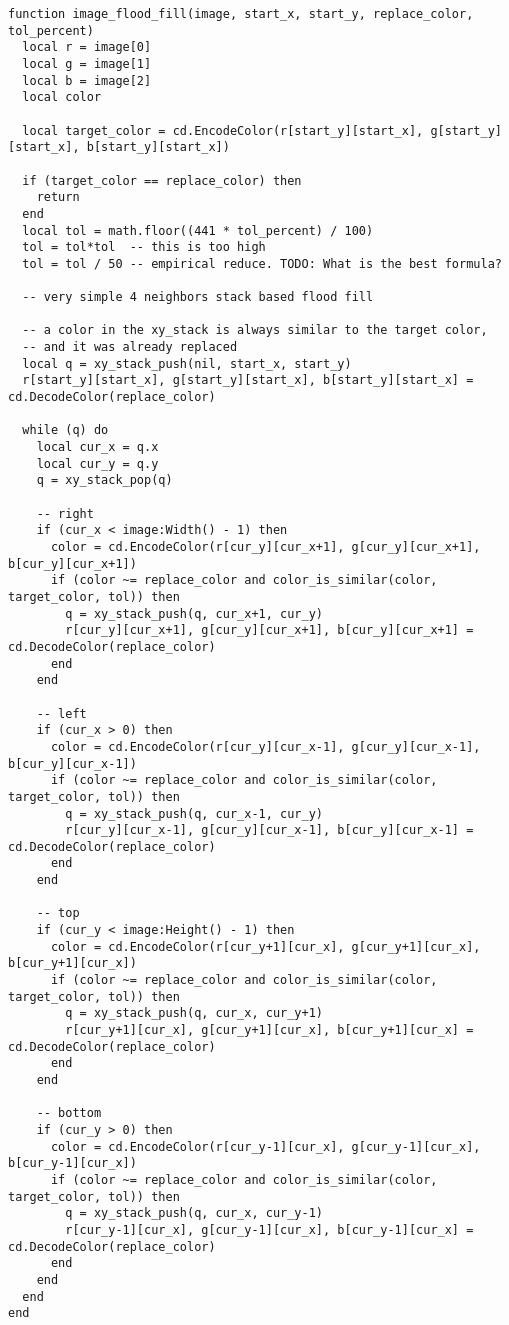 \documentclass{ctexart}
\begin{document}
\begin{lstlisting}
function image_flood_fill(image, start_x, start_y, replace_color, tol_percent)
  local r = image[0]
  local g = image[1]
  local b = image[2]
  local color

  local target_color = cd.EncodeColor(r[start_y][start_x], g[start_y][start_x], b[start_y][start_x])
  
  if (target_color == replace_color) then
    return
  end
  local tol = math.floor((441 * tol_percent) / 100)
  tol = tol*tol  -- this is too high
  tol = tol / 50 -- empirical reduce. TODO: What is the best formula?

  -- very simple 4 neighbors stack based flood fill

  -- a color in the xy_stack is always similar to the target color,
  -- and it was already replaced
  local q = xy_stack_push(nil, start_x, start_y)
  r[start_y][start_x], g[start_y][start_x], b[start_y][start_x] = cd.DecodeColor(replace_color)
  
  while (q) do
    local cur_x = q.x
    local cur_y = q.y
    q = xy_stack_pop(q)
    
    -- right 
    if (cur_x < image:Width() - 1) then
      color = cd.EncodeColor(r[cur_y][cur_x+1], g[cur_y][cur_x+1], b[cur_y][cur_x+1])
      if (color ~= replace_color and color_is_similar(color, target_color, tol)) then
        q = xy_stack_push(q, cur_x+1, cur_y)
        r[cur_y][cur_x+1], g[cur_y][cur_x+1], b[cur_y][cur_x+1] = cd.DecodeColor(replace_color)
      end
    end

    -- left 
    if (cur_x > 0) then
      color = cd.EncodeColor(r[cur_y][cur_x-1], g[cur_y][cur_x-1], b[cur_y][cur_x-1])
      if (color ~= replace_color and color_is_similar(color, target_color, tol)) then
        q = xy_stack_push(q, cur_x-1, cur_y)
        r[cur_y][cur_x-1], g[cur_y][cur_x-1], b[cur_y][cur_x-1] = cd.DecodeColor(replace_color)
      end
    end

    -- top
    if (cur_y < image:Height() - 1) then
      color = cd.EncodeColor(r[cur_y+1][cur_x], g[cur_y+1][cur_x], b[cur_y+1][cur_x])
      if (color ~= replace_color and color_is_similar(color, target_color, tol)) then
        q = xy_stack_push(q, cur_x, cur_y+1)
        r[cur_y+1][cur_x], g[cur_y+1][cur_x], b[cur_y+1][cur_x] = cd.DecodeColor(replace_color)
      end
    end

    -- bottom
    if (cur_y > 0) then
      color = cd.EncodeColor(r[cur_y-1][cur_x], g[cur_y-1][cur_x], b[cur_y-1][cur_x])
      if (color ~= replace_color and color_is_similar(color, target_color, tol)) then
        q = xy_stack_push(q, cur_x, cur_y-1)
        r[cur_y-1][cur_x], g[cur_y-1][cur_x], b[cur_y-1][cur_x] = cd.DecodeColor(replace_color)
      end
    end
  end
end


\end{lstlisting}
\end{document}
